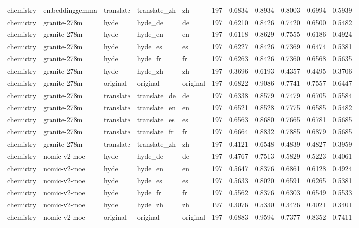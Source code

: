 \begin{tabular}{lllllrrrrrr}
chemistry & embeddinggemma & translate & translate\_zh & zh & 197 & 0.6834 & 0.8934 & 0.8003 & 0.6994 & 0.5939 \\
chemistry & granite-278m & hyde & hyde\_de & de & 197 & 0.6210 & 0.8426 & 0.7420 & 0.6500 & 0.5482 \\
chemistry & granite-278m & hyde & hyde\_en & en & 197 & 0.6118 & 0.8629 & 0.7555 & 0.6186 & 0.4924 \\
chemistry & granite-278m & hyde & hyde\_es & es & 197 & 0.6227 & 0.8426 & 0.7369 & 0.6474 & 0.5381 \\
chemistry & granite-278m & hyde & hyde\_fr & fr & 197 & 0.6263 & 0.8426 & 0.7360 & 0.6568 & 0.5635 \\
chemistry & granite-278m & hyde & hyde\_zh & zh & 197 & 0.3696 & 0.6193 & 0.4357 & 0.4495 & 0.3706 \\
chemistry & granite-278m & original & original & original & 197 & 0.6822 & 0.9086 & 0.7741 & 0.7557 & 0.6447 \\
chemistry & granite-278m & translate & translate\_de & de & 197 & 0.6338 & 0.8579 & 0.7479 & 0.6705 & 0.5584 \\
chemistry & granite-278m & translate & translate\_en & en & 197 & 0.6521 & 0.8528 & 0.7775 & 0.6585 & 0.5482 \\
chemistry & granite-278m & translate & translate\_es & es & 197 & 0.6563 & 0.8680 & 0.7665 & 0.6781 & 0.5685 \\
chemistry & granite-278m & translate & translate\_fr & fr & 197 & 0.6664 & 0.8832 & 0.7885 & 0.6879 & 0.5685 \\
chemistry & granite-278m & translate & translate\_zh & zh & 197 & 0.4121 & 0.6548 & 0.4839 & 0.4827 & 0.3959 \\
chemistry & nomic-v2-moe & hyde & hyde\_de & de & 197 & 0.4767 & 0.7513 & 0.5829 & 0.5223 & 0.4061 \\
chemistry & nomic-v2-moe & hyde & hyde\_en & en & 197 & 0.5647 & 0.8376 & 0.6861 & 0.6128 & 0.4924 \\
chemistry & nomic-v2-moe & hyde & hyde\_es & es & 197 & 0.5633 & 0.8020 & 0.6591 & 0.6265 & 0.5381 \\
chemistry & nomic-v2-moe & hyde & hyde\_fr & fr & 197 & 0.5562 & 0.8376 & 0.6303 & 0.6549 & 0.5533 \\
chemistry & nomic-v2-moe & hyde & hyde\_zh & zh & 197 & 0.3076 & 0.5330 & 0.3426 & 0.4021 & 0.3401 \\
chemistry & nomic-v2-moe & original & original & original & 197 & 0.6883 & 0.9594 & 0.7377 & 0.8352 & 0.7411 \\

\end{tabular}
